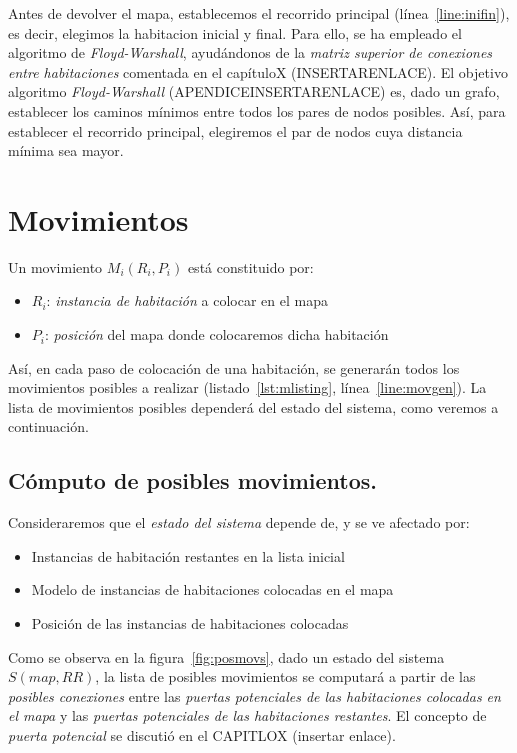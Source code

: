 Antes de devolver el mapa, establecemos el recorrido principal (línea~\ref{line:inifin}), es decir, elegimos la habitacion inicial y final. Para ello, se ha empleado el algoritmo de \emph{Floyd-Warshall}, ayudándonos de la \emph{matriz superior de conexiones entre habitaciones} comentada en el capítuloX (INSERTARENLACE). El objetivo algoritmo \emph{Floyd-Warshall} (APENDICEINSERTARENLACE) es, dado un grafo, establecer los caminos mínimos entre todos los pares de nodos posibles. Así, para establecer el recorrido principal, elegiremos el par de nodos cuya distancia mínima sea mayor.

\section{Movimientos}

Un movimiento $M_i(R_i,P_i)$ está constituido por:

\begin{itemize}
	\item$R_i$: \emph{instancia de habitación} a colocar en el mapa
	\item$P_i$: \emph{posición} del mapa donde colocaremos dicha habitación
\end{itemize}

Así, en cada paso de colocación de una habitación, se generarán todos los movimientos posibles a realizar (listado~\ref{lst:mlisting}, línea~\ref{line:movgen}). La lista de movimientos posibles dependerá del estado del sistema, como veremos a continuación.

\subsection{Cómputo de posibles movimientos.}

Consideraremos que el \emph{estado del sistema} depende de, y se ve afectado por:

\begin{itemize}
	\item Instancias de habitación restantes en la lista inicial
	\item Modelo de instancias de habitaciones colocadas en el mapa
	\item Posición de las instancias de habitaciones colocadas
\end{itemize}

Como se observa en la figura~\ref{fig:posmovs}, dado un estado del sistema $S(map,RR)$, la lista de posibles movimientos se computará a partir de las \emph{posibles conexiones} entre las \emph{puertas potenciales de las habitaciones colocadas en el mapa} y las \emph{puertas potenciales de las habitaciones restantes}. El concepto de \emph{puerta potencial} se discutió en el CAPITLOX (insertar enlace).

